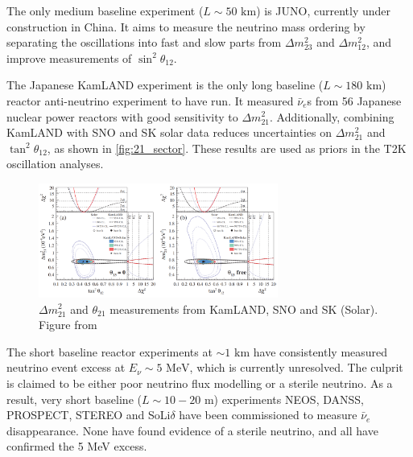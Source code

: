 The only medium baseline experiment ($L\sim50\text{ km}$) is JUNO\cite{juno}, currently under construction in China. It aims to measure the neutrino mass ordering by separating the oscillations into fast and slow parts from $\Delta m^2_{23}$ and $\Delta m^2_{12}$, and improve measurements of $\sin^2 \theta_{12}$.

The Japanese KamLAND experiment is the only long baseline ($L\sim180\text{ km}$) reactor anti-neutrino experiment to have run. It measured $\bar{\nu}_e$s from 56 Japanese nuclear power reactors with good sensitivity to $\Delta m^2_{21}$. Additionally, combining KamLAND with SNO and SK solar data reduces uncertainties on $\Delta m^2_{21}$ and $\tan^2\theta_{12}$, as shown in \autoref{fig:21_sector}. These results are used as priors in the T2K oscillation analyses.
\begin{figure}[h]
	\includegraphics[width=0.7\textwidth, trim={0mm 0mm 0mm 0mm}, clip,page=1]{figures/theory/kamland_solar_comb}
	\caption{$\Delta m^2_{21}$ and $\theta_{21}$ measurements from KamLAND, SNO and SK (Solar). Figure from \cite{kamland_2011}}
	\label{fig:21_sector}
\end{figure}

The short baseline reactor experiments at $\sim1\text{ km}$ have consistently measured neutrino event excess at $E_\nu\sim5\text{ MeV}$\cite{double_chooz, daya_bay, reno}, which is currently unresolved. The culprit is claimed to be either poor neutrino flux modelling or a sterile neutrino\cite{huber_neos,steriles}. As a result, very short baseline ($L\sim10-20\text{ m}$) experiments NEOS\cite{neos}, DANSS\cite{danss}, PROSPECT\cite{prospect}, STEREO\cite{stereo} and SoLi$\delta$\cite{solid} have been commissioned to measure $\bar{\nu}_e$ disappearance. None have found evidence of a sterile neutrino, and all have confirmed the 5 MeV excess.
